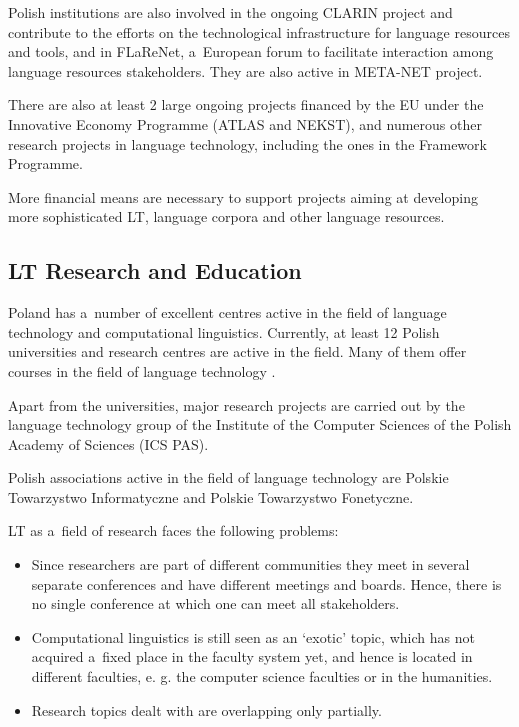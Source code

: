 \begin{multicols}{2}
Polish institutions are also involved in the ongoing CLARIN project
and contribute to the efforts on the technological infrastructure for
language resources and tools, and in FLaReNet, a~European forum to
facilitate interaction among language resources stakeholders. They are
also active in META-NET project. 

There are also at least 2 large ongoing projects financed by the EU
under the Innovative Economy Programme (ATLAS and NEKST), and numerous
other research projects in language technology, including the ones in
the Framework Programme. 

More financial means are necessary to support projects aiming at
developing more sophisticated LT, language corpora and other language
resources. 

\subsection[LT Research and Education]{LT Research and Education} 

Poland has a~number of excellent centres active in the field of
language technology and computational linguistics. Currently, at least
12 Polish universities and research centres are active in the field.
Many of them offer courses in the field of language technology
\cite{centers1}. 

Apart from the universities, major research projects are carried out
by the language technology group of the Institute of the Computer
Sciences of the Polish Academy of Sciences (ICS PAS). 

Polish associations active in the field of language technology are
Polskie Towarzystwo Informatyczne and Polskie Towarzystwo Fonetyczne. 

LT as a~field of research faces the following problems: 

\begin{itemize} \item Since researchers are part of different
communities they meet in several separate conferences and have
different meetings and boards. Hence, there is no single conference at
which one can meet all stakeholders. \item Computational linguistics
is still seen as an ‘exotic’ topic, which has not acquired a~fixed
place in the faculty system yet, and hence is located in different
faculties, e. g. the computer science faculties or in the humanities.
\item Research topics dealt with are overlapping only partially.
\end{itemize} 


\end{multicols}
